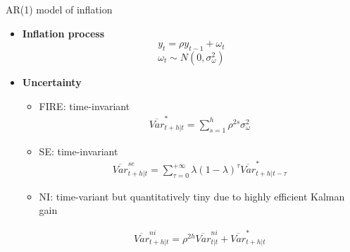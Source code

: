 \documentclass{beamer}
\begin{document}
\begin{frame}{AR(1) model of inflation}
	

\begin{itemize}
	
\item 	\textbf{Inflation process}	
	$$y_{t} = \rho y_{t-1} + \omega_t  $$ 
	$$\omega_t \sim N(0,\sigma^2_{\omega})$$

\item \textbf{Uncertainty}
		\begin{itemize}
			\item FIRE: time-invariant 
			\begin{eqnarray*}\label{VarREPop}
				\overline{Var}^*_{t+h|t} = \sum^{h}_{s=1}\rho^{2s} \sigma^2_{\omega}
			\end{eqnarray*}
			
			\item SE: time-invariant 
			\begin{eqnarray*}\label{VarSEPopRE}
				\overline{Var}^{se}_{t+h|t} = \sum^{+\infty}_{\tau =0} \lambda (1-\lambda)^\tau \overline{Var}^*_{t+h|t-\tau}
			\end{eqnarray*}
			
			\item NI: time-variant but quantitatively tiny due to highly efficient Kalman gain
			
			\begin{eqnarray*}\label{VarNIPopRE}
				\overline{Var}^{ni}_{t+h|t} = \rho^{2h} \overline{Var}^{ni}_{t|t} + \overline{Var}^*_{t+h|t}
			\end{eqnarray*}
		\end{itemize}
		
	\end{itemize}
	
\end{frame}
\end{document}
